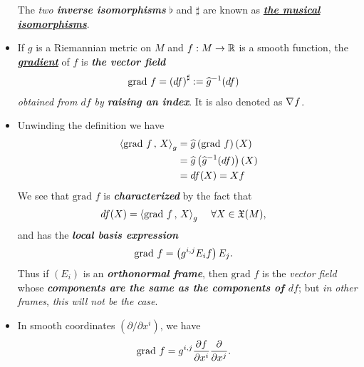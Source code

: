 \documentclass[11pt]{article}
\begin{document}
\begin{itemize}
\begin{definition}
The \emph{two \textbf{inverse isomorphisms}} $\flat$ and $\sharp$ are known as \underline{\emph{\textbf{the musical isomorphisms}}}.
\end{definition}

\item \begin{definition}
If $g$ is a Riemannian metric on $M$ and $f: M \rightarrow {\mathbb R}$ is a smooth function, the \underline{\emph{\textbf{gradient}}} of $f$ is \emph{\textbf{the vector field}}
\begin{align*}
\text{grad }f &= \left(df\right)^{\sharp}:= \widehat{g}^{-1}(df)
\end{align*}  \emph{obtained from $df$ by \textbf{raising an index}}. It is also denoted as $\nabla_{}{f}$.
\end{definition}



\item \begin{remark}
Unwinding the definition we have
\begin{align*}
\left\langle \text{grad }f\,,\, X \right\rangle_{g} &= \widehat{g}\left(\text{grad }f\right)(X)\\
&=  \widehat{g}\left( \widehat{g}^{-1}(df)\right)(X) \\
&= df(X) = Xf
\end{align*}
We see that  $\text{grad }f$ is \emph{\textbf{characterized}} by the fact that
\begin{align}
df(X) &= \left\langle \text{grad }f\,,\, X \right\rangle_{g}\, \quad \forall X  \in {\mathfrak X}(M),  \label{eqn: gradient_projection_differential}
\end{align} and has the \textit{\textbf{local basis expression}}
\begin{align}
\text{grad }f&= \left(g^{i,j}E_i f\right) E_j. \label{eqn: gradient_coordinate_representation}
\end{align} Thus if $(E_i)$ is an \emph{\textbf{orthonormal frame}}, then $\text{grad }f$ is the \emph{vector field} whose \emph{\textbf{components are the same as the components of $df$}}; but \emph{in other frames}, \emph{this will not be the case}. 
\end{remark}

\item \begin{remark}
In smooth coordinates $(\partial / \partial x^i)$, we have
\begin{align}
\text{grad }f&= g^{i,j}\frac{\partial f}{ \partial x^i}\frac{\partial }{ \partial x^j}. \label{eqn: gradient_coordinate_representation_2}
\end{align}
\end{remark}


\end{itemize}
\end{document}
